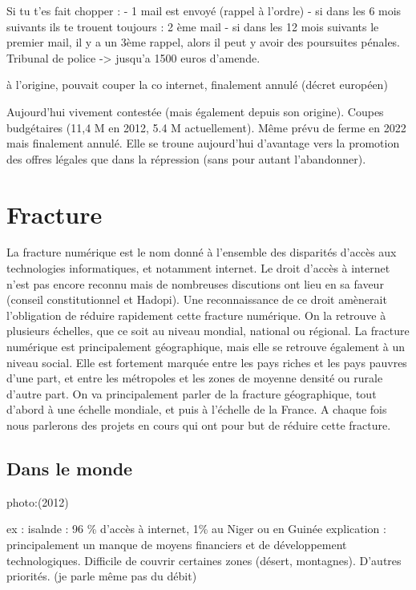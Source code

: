 \documentclass{article}
\begin{document}
Si tu t'es fait chopper :
- 1 mail est envoyé (rappel à l'ordre)
- si dans les 6 mois suivants ils te trouent toujours : 2 ème mail
- si dans les 12 mois suivants le premier mail, il y a un 3ème rappel, alors il peut y avoir des poursuites pénales. Tribunal de police -> jusqu'a 1500 euros d'amende.

à l'origine, pouvait couper la co internet, finalement annulé (décret européen)

Aujourd'hui vivement contestée (mais également depuis son origine). Coupes budgétaires (11,4 M en 2012, 5.4 M actuellement). Même prévu de ferme en 2022
mais finalement annulé. Elle se troune aujourd'hui d'avantage vers la promotion des offres légales que dans la répression (sans pour autant l'abandonner).
\section{Fracture}
La fracture numérique est le nom donné à l'ensemble des disparités d'accès aux technologies informatiques, et notamment internet. 
Le droit d'accès à internet n'est pas encore reconnu mais de nombreuses discutions ont lieu en sa faveur (conseil constitutionnel et Hadopi). Une reconnaissance de ce droit amènerait l'obligation de réduire rapidement cette fracture numérique.
On la retrouve à plusieurs échelles, que ce soit au niveau mondial, national ou régional. La fracture numérique est principalement géographique, mais elle se retrouve également à un niveau social. Elle est fortement marquée entre les pays riches et les pays pauvres d'une part, et entre les métropoles et les zones de moyenne densité ou rurale d'autre part. 
On va principalement parler de la fracture géographique, tout d'abord à une échelle mondiale, et puis à l'échelle de la France. A chaque fois nous parlerons des projets en cours qui ont pour but de réduire cette fracture.
\subsection{Dans le monde}
photo:(2012)

ex : isalnde : 96 \% d'accès à internet, 1\% au Niger ou en Guinée
explication : principalement un manque de moyens financiers et de développement technologiques. Difficile de couvrir certaines zones (désert, montagnes). D'autres priorités. (je parle même pas du débit)
\end{document}
